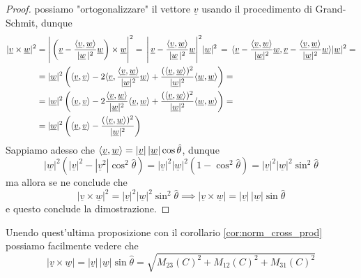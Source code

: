 \begin{proof}
possiamo "ortogonalizzare" il vettore $\underline{v}$ usando il procedimento di Grand-Schmit, dunque
\begin{align*}
	|\underline{v} \times \underline{w}|^2 
	&= \Bigg| \left( \underline{v} - \frac{\langle \underline{v}, \underline{w} \rangle}{|\underline{w}\,|^2} \underline{w} \right) \times \underline{w} \Bigg|^2 =\, 
	\Bigg|\, \underline{v} - \frac{\langle \underline{v}, \underline{w} \rangle}{|\underline{w}\,|^2} \underline{w} \Bigg|^2 |\underline{w}|^2\, =\, 
	\langle \underline{v} - \frac{\langle \underline{v}, \underline{w} \rangle}{|\underline{w}|^2} \underline{w}, \underline{v} - \frac{\langle \underline{v}, \underline{w} \rangle}{|\underline{w}|^2} \underline{w} \rangle |\underline{w}|^2 = \\
	&= |\underline{w}|^2 \left( \langle \underline{v}, \underline{v} \rangle - 2 \langle \underline{v}, \frac{\langle \underline{v}, \underline{w} \rangle}{|\underline{w}|^2} \underline{w} \rangle + \frac{(\langle \underline{v}, \underline{w} \rangle)^2}{|\underline{w}|^2} \langle \underline{w}, \underline{w} \rangle \right) = \\
	&= |\underline{w}|^2 \left( \langle \underline{v}, \underline{v} \rangle - 2 \frac{\langle \underline{v}, \underline{w} \rangle}{|\underline{w}|^2} \langle \underline{v}, \underline{w} \rangle + \frac{(\langle \underline{v}, \underline{w} \rangle)^2}{|\underline{w}|^2} \langle \underline{w}, \underline{w} \rangle \right) = \\
	&= |\underline{w}|^2 \left( \langle \underline{v}, \underline{v} \rangle - \frac{(\langle \underline{v}, \underline{w} \rangle)^2}{|\underline{w}|^2} \right)
\end{align*}
Sappiamo adesso che $\langle \underline{v}, \underline{w} \rangle = |\underline{v}| \, |\underline{w}|\cos{\hat{\theta}}$, dunque
\[
|\underline{w}|^2 \left(|\underline{v}|^2 - |\underline{v}^2|\cos^2{\hat{\theta}} \right) = |\underline{v}|^2 |\underline{w}|^2 (1-\cos^2{\hat{\theta}}) = |\underline{v}|^2 |\underline{w}|^2 \sin^2{\hat{\theta}}
\]
ma allora se ne conclude che
\[
|\underline{v} \times \underline{w}|^2 = |\underline{v}|^2 |\underline{w}|^2 \sin^2{\hat{\theta}} \implies |\underline{v} \times \underline{w}| = |\underline{v}| \, |\underline{w}|\sin{\hat{\theta}}
\]
e questo conclude la dimostrazione.
\end{proof}
%
\begin{remark}
Unendo quest'ultima proposizione con il corollario \ref{cor:norm_cross_prod} possiamo facilmente vedere che
\[
|\underline{v} \times \underline{w}| = |\underline{v}| \, |\underline{w}| \sin{\hat{\theta}} = \sqrt{M_{23}(C)^2 + M_{12}(C)^2 + M_{31}(C)^2}
\]
\end{remark}
